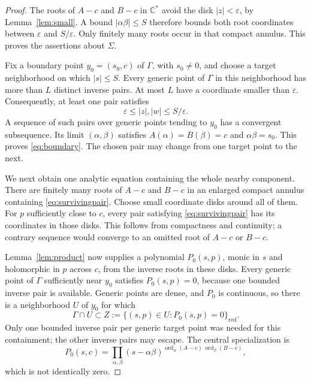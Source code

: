\documentclass[11pt,reqno]{amsart}
\theoremstyle{remark}
\numberwithin{equation}{section}
\newcommand{\C}{\mathbb C}
\newcommand{\Cs}{\C^*}
\newcommand{\ord}{\operatorname{ord}}
\newcommand{\red}{\mathrm{red}}
\begin{document}
\begin{proof}
The roots of $A-c$ and $B-c$ in $\Cs$ avoid the disk
$|z|<\varepsilon$, by Lemma~\ref{lem:small}. A bound
$|\alpha\beta|\le S$ therefore bounds both root coordinates between
$\varepsilon$ and $S/\varepsilon$. Only finitely many roots occur in
that compact annulus. This proves the assertions about $\Sigma$.

Fix a boundary point $y_0=(s_0,c)$ of $\Gamma$, with $s_0\ne0$, and
choose a target neighborhood on which $|s|\le S$. Every generic point
of $\Gamma$ in this neighborhood has more than $L$ distinct inverse
pairs. At most $L$ have a coordinate smaller than $\varepsilon$.
Consequently, at least one pair satisfies
\begin{equation}\label{eq:survivingpair}
 \varepsilon\le |z|,|w|\le S/\varepsilon.
\end{equation}
A sequence of such pairs over generic points tending to $y_0$ has a
convergent subsequence. Its limit $(\alpha,\beta)$ satisfies
$A(\alpha)=B(\beta)=c$ and $\alpha\beta=s_0$.
This proves \eqref{eq:boundary}. The chosen pair may change from one
target point to the next.

We next obtain one analytic equation containing the whole nearby
component. There are finitely many roots of $A-c$ and $B-c$ in an
enlarged compact annulus containing \eqref{eq:survivingpair}. Choose
small coordinate disks around all of them. For $p$ sufficiently close
to $c$, every pair satisfying \eqref{eq:survivingpair} has its
coordinates in those disks. This follows from compactness and
continuity; a contrary sequence would converge to an omitted root
of $A-c$ or $B-c$.

Lemma~\ref{lem:product} now supplies a polynomial $P_0(s,p)$, monic
in $s$ and holomorphic in $p$ across $c$, from the inverse roots in
these disks. Every generic point of $\Gamma$ sufficiently near $y_0$
satisfies $P_0(s,p)=0$, because one bounded inverse pair is available.
Generic points are dense, and $P_0$ is continuous, so there is a
neighborhood $U$ of $y_0$ for which
\begin{equation}\label{eq:componentcontainment}
 \Gamma\cap U\subset
 Z:=\{(s,p)\in U:P_0(s,p)=0\}_{\red}.
\end{equation}
Only one bounded inverse pair per generic target point was needed
for this containment; the other inverse pairs may escape. The
central specialization is
\begin{equation}\label{eq:centralP}
 P_0(s,c)=\prod_{\alpha,\beta}
 (s-\alpha\beta)^{\ord_\alpha(A-c)\,\ord_\beta(B-c)},
\end{equation}
which is not identically zero.


\end{proof}
\end{document}
